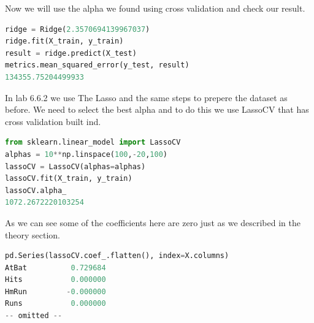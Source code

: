 Now we will use the alpha we found using  cross validation and check our result.
\begin{lstlisting}[language=Python]
ridge = Ridge(2.3570694139967037)
ridge.fit(X_train, y_train)
result = ridge.predict(X_test)
metrics.mean_squared_error(y_test, result)
134355.75204499933
\end{lstlisting}
In lab 6.6.2 we use The Lasso and the same steps to prepere the dataset as before. We need to select the best alpha and to do this we use LassoCV that has cross validation built ind.
\begin{lstlisting}[language=Python]
from sklearn.linear_model import LassoCV
alphas = 10**np.linspace(100,-20,100)
lassoCV = LassoCV(alphas=alphas)
lassoCV.fit(X_train, y_train)
lassoCV.alpha_
1072.2672220103254
\end{lstlisting}
As we can see some of the coefficients here are zero just as we described in the theory section.
\begin{lstlisting}[language=Python]
pd.Series(lassoCV.coef_.flatten(), index=X.columns)
AtBat          0.729684
Hits           0.000000
HmRun         -0.000000
Runs           0.000000
-- omitted --
\end{lstlisting}






